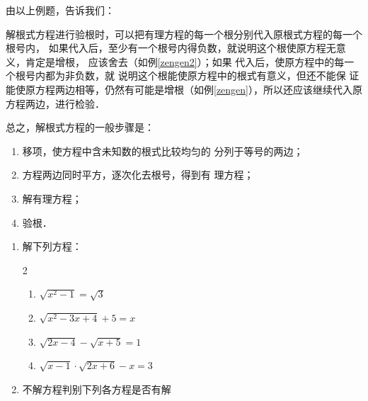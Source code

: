 由以上例题，告诉我们：

解根式方程进行验根时，可以把有理方程的每一个根分别代入原根式方程的每一个根号内，
如果代入后，至少有一个根号内得负数，就说明这个根使原方程无意义，肯定是增根，
应该舍去（如例\ref{zengen2}）；如果
代入后，使原方程中的每一个根号内都为非负数，就
说明这个根能使原方程中的根式有意义，但还不能保
证能使原方程两边相等，仍然有可能是增根（如例\ref{zengen}），所以还应该继续代入原方程两边，进行检验．

总之，解根式方程的一般步骤是：
\begin{enumerate}
    \item 移项，使方程中含未知数的根式比较均匀的
    分列于等号的两边；
    \item 方程两边同时平方，逐次化去根号，得到有
    理方程；
    \item 解有理方程；
    \item 验根．
\end{enumerate}

\begin{ex}
\begin{enumerate}
    \item 解下列方程：
    \begin{multicols}{2}
      \begin{enumerate}
    \item $\sqrt{x^2-1}=\sqrt{3}$
    \item $\sqrt{x^2-3x+4}+5=x$
    \item $\sqrt{2x-4}-\sqrt{x+5}=1$
    \item $\sqrt{x-1}\cdot \sqrt{2x+6}-x=3$
    \end{enumerate}      
    \end{multicols}


    \item 不解方程判别下列各方程是否有解
      \begin{enumerate}
   
    \end{enumerate}  
\end{enumerate}
\end{ex}

